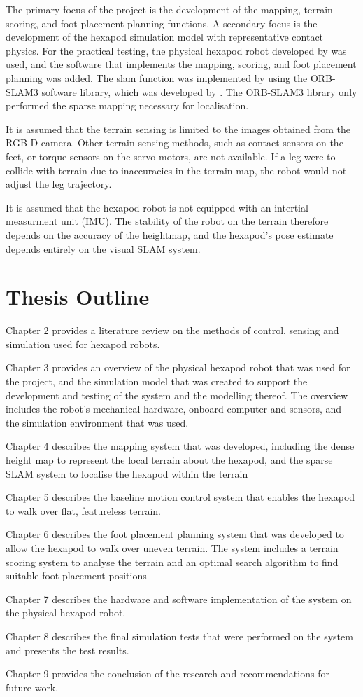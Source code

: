     The primary focus of the project is the development of the mapping, terrain scoring, and foot placement planning
    functions. A secondary focus is the development of the hexapod simulation model with representative contact physics.
    For the practical testing, the physical hexapod robot developed by \cite{erasmus2023guidance} was used, and the software
    that implements the  mapping, scoring, and foot placement planning was added. The \ac{slam} function was implemented
    by using the ORB-SLAM3 software library, which was developed by \cite{campos2021orb}. The ORB-SLAM3 library only performed
    the sparse mapping necessary for localisation.

    It is assumed that the terrain sensing is limited to the images obtained from the RGB-D camera. Other terrain
    sensing methods, such as contact sensors on the feet, or torque sensors on the servo motors, are not available.
    If a leg were to collide with terrain due to inaccuracies in the terrain map, the robot would not adjust the leg trajectory.

    It is assumed that the hexapod robot is not equipped with an intertial measurment unit (IMU). The stability of the
    robot on the terrain therefore depends on the accuracy of the heightmap, and the hexapod's pose estimate depends
    entirely on the visual SLAM system.

\section{Thesis Outline}

    Chapter 2 provides a literature review on the methods of control, sensing and simulation used for hexapod robots.

    Chapter 3 provides an overview of the physical hexapod robot that was used for the project, and the simulation model that was created to
    support the development and testing of the system and the modelling thereof. The overview includes the robot's mechanical hardware,
    onboard computer and sensors, and the simulation environment that was used.

    Chapter 4 describes the mapping system that was developed, including the dense height map to represent
    the local terrain about the hexapod, and the sparse SLAM system to localise the hexapod within the terrain

    Chapter 5 describes the baseline motion control system that enables the hexapod to walk over flat, featureless terrain.

    Chapter 6 describes the foot placement planning system that was developed to allow the hexapod to walk over
    uneven terrain. The system includes a terrain scoring system to analyse the terrain and an optimal search algorithm to find suitable foot placement positions

    Chapter 7 describes the hardware and software implementation of the system on the physical hexapod robot.

    Chapter 8 describes the final simulation tests that were performed on the system and presents the test results.

    Chapter 9 provides the conclusion of the research and recommendations for future work.
